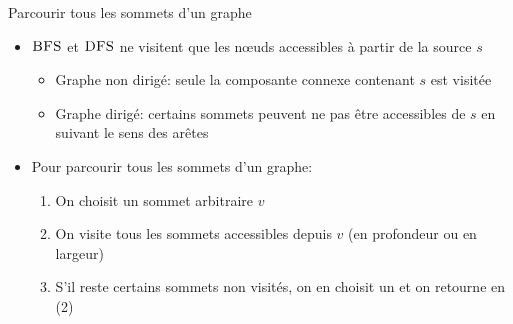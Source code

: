 \begin{frame}{Parcourir tous les sommets d'un graphe}

\begin{itemize}
\item $\textnormal{\scshape BFS}$ et $\textnormal{\scshape DFS}$ ne visitent que les n\oe uds
  accessibles à partir de la source $s$
\begin{itemize}
\item Graphe non dirigé: seule la composante connexe contenant $s$ est visitée
\item Graphe dirigé: certains sommets peuvent ne pas être accessibles
  de $s$ en suivant le sens des arêtes
\end{itemize}
\item Pour parcourir tous les sommets d'un graphe:
\begin{enumerate}
\item On choisit un sommet arbitraire $v$
\item On visite tous les sommets accessibles depuis $v$ (en profondeur ou en largeur)
\item S'il reste certains sommets non visités, on en choisit un et on retourne en (2)
\end{enumerate}
\end{itemize}

\end{frame}

